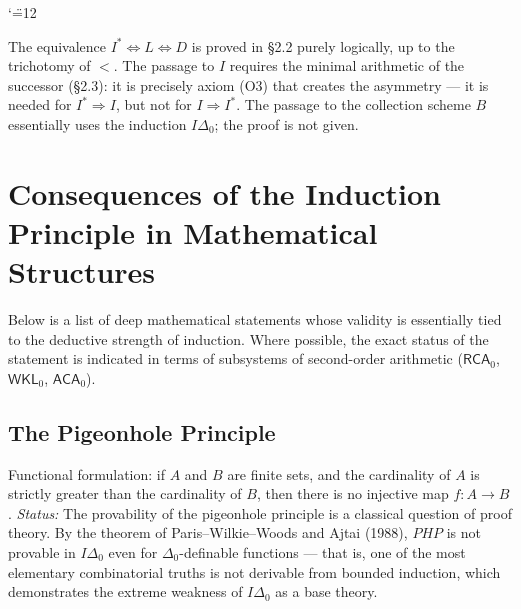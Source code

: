 \documentclass[12pt,a4paper]{article}
\theoremstyle{plain}
\theoremstyle{definition}
\newcommand{\toinf}{\rightarrow}
\begin{document}
\begin{center}
\catcode`\"=12
\end{center}

The equivalence $I^*\Leftrightarrow L\Leftrightarrow D$ is proved in §2.2 purely logically, up to the trichotomy of $<$. The passage to $I$ requires the minimal arithmetic of the successor (§2.3): it is precisely axiom (O3) that creates the asymmetry --- it is needed for $I^*\Rightarrow I$, but not for $I\Rightarrow I^*$. The passage to the collection scheme $B$ essentially uses the induction $I\Delta_0$; the proof is not given.

\section{Consequences of the Induction Principle in Mathematical Structures}

Below is a list of deep mathematical statements whose validity is essentially tied to the deductive strength of induction. Where possible, the exact status of the statement is indicated in terms of subsystems of second-order arithmetic ($\textsf{RCA}_0$, $\textsf{WKL}_0$, $\textsf{ACA}_0$).

\subsection{The Pigeonhole Principle}
Functional formulation: if $A$ and $B$ are finite sets, and the cardinality of $A$ is strictly greater than the cardinality of $B$, then there is no injective map $f: A \toinf B$.
\textit{Status:} The provability of the pigeonhole principle is a classical question of proof theory. By the theorem of Paris--Wilkie--Woods and Ajtai (1988), $PHP$ is not provable in $I\Delta_0$ even for $\Delta_0$-definable functions --- that is, one of the most elementary combinatorial truths is not derivable from bounded induction, which demonstrates the extreme weakness of $I\Delta_0$ as a base theory.
\end{document}
